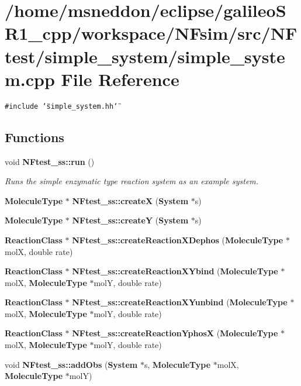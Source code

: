 \section{/home/msneddon/eclipse/galileoSR1\_\-cpp/workspace/NFsim/src/NFtest/simple\_\-system/simple\_\-system.cpp File Reference}
\label{simple__system_8cpp}


{\tt \#include \char`\"{}simple\_\-system.hh\char`\"{}}\par
\subsection*{Functions}
\begin{CompactItemize}
\item 
void {\bf NFtest\_\-ss::run} ()
\begin{CompactList}\small\item\em Runs the simple enzymatic type reaction system as an example system. \item\end{CompactList}\item 
{\bf MoleculeType} $\ast$ {\bf NFtest\_\-ss::createX} ({\bf System} $\ast$s)
\item 
{\bf MoleculeType} $\ast$ {\bf NFtest\_\-ss::createY} ({\bf System} $\ast$s)
\item 
{\bf ReactionClass} $\ast$ {\bf NFtest\_\-ss::createReactionXDephos} ({\bf MoleculeType} $\ast$molX, double rate)
\item 
{\bf ReactionClass} $\ast$ {\bf NFtest\_\-ss::createReactionXYbind} ({\bf MoleculeType} $\ast$molX, {\bf MoleculeType} $\ast$molY, double rate)
\item 
{\bf ReactionClass} $\ast$ {\bf NFtest\_\-ss::createReactionXYunbind} ({\bf MoleculeType} $\ast$molX, {\bf MoleculeType} $\ast$molY, double rate)
\item 
{\bf ReactionClass} $\ast$ {\bf NFtest\_\-ss::createReactionYphosX} ({\bf MoleculeType} $\ast$molX, {\bf MoleculeType} $\ast$molY, double rate)
\item 
void {\bf NFtest\_\-ss::addObs} ({\bf System} $\ast$s, {\bf MoleculeType} $\ast$molX, {\bf MoleculeType} $\ast$molY)
\end{CompactItemize}
